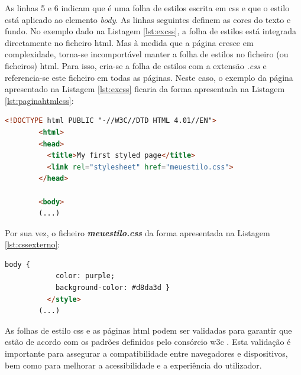 As linhas 5 e 6 indicam que é uma folha de estilos escrita em \acrshort{css} e que o estilo está aplicado ao elemento \textit{body}. As linhas seguintes definem as cores do texto e fundo. No exemplo dado na Listagem \ref{lst:excss}, a folha de estilos está integrada directamente no ficheiro \acrshort{html}. Mas à medida que a página cresce em complexidade, torna-se incomportável manter a folha de estilos no ficheiro (ou ficheiros) \acrshort{html}. Para isso, cria-se a folha de estilos com a extensão \textit{.css} e referencia-se este ficheiro em todas as páginas. Neste caso, o exemplo da página apresentado na Listagem \ref{lst:excss} ficaria da forma apresentada na Listagem \ref{lst:paginahtmlcss}:

\begin{minipage}{0.9\linewidth}
    \begin{lstlisting}[language=HTML, caption=Exemplo da página \acrshort{html} com o \acrshort{css} definida externamente \cite{Startingcss}, label=lst:paginahtmlcss]
		<!DOCTYPE html PUBLIC "-//W3C//DTD HTML 4.01//EN">
		<html>
		<head>
		  <title>My first styled page</title>
		  <link rel="stylesheet" href="meuestilo.css">
		</head>
		
		<body>
		(...)
	\end{lstlisting}
\end{minipage}

Por sua vez, o ficheiro \textit{\textbf{meuestilo.css}} da forma apresentada na Listagem \ref{lst:cssexterno}:

\begin{minipage}{0.9\linewidth}
    \begin{lstlisting}[language=HTML, caption=Exemplo do \acrshort{css} definido externamente \cite{Startingcss}, label=lst:cssexterno]
		body {
			color: purple;
			background-color: #d8da3d }
		  </style>
		(...)
	\end{lstlisting}
\end{minipage}

As folhas de estilo \acrshort{css} e as páginas \acrshort{html} podem ser validadas para garantir que estão de acordo com os padrões definidos pelo consórcio \gls{w3c} \cite{cssvalidator, htmlvalidator}. Esta validação é importante para assegurar a compatibilidade entre navegadores e dispositivos, bem como para melhorar a acessibilidade e a experiência do utilizador.

